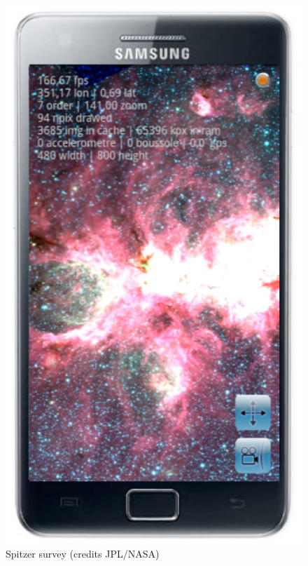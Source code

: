 \begin{figure}[ht]
\includegraphics[scale=0.28]{part5/Schaaff_O28/O28_f3.eps}
\caption{Spitzer survey (credits JPL/NASA)} 
\label{O28:2}
\end{figure}

